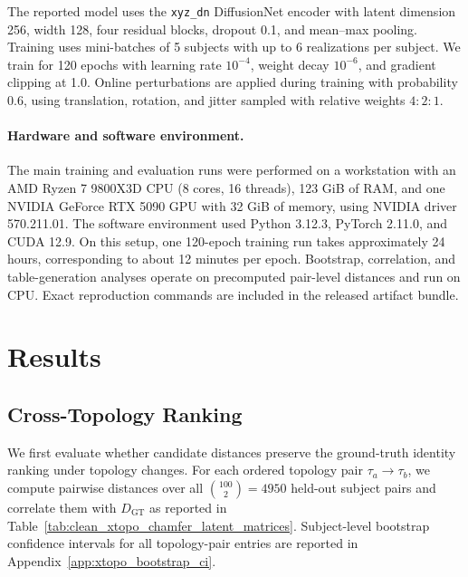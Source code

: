 \documentclass{article}
\begin{document}
The reported model uses the \texttt{xyz\_dn} DiffusionNet encoder with latent dimension 256, width 128, four residual blocks, dropout 0.1, and mean--max pooling. Training uses mini-batches of 5 subjects with up to 6 realizations per subject. We train for 120 epochs with learning rate $10^{-4}$, weight decay $10^{-6}$, and gradient clipping at 1.0. Online perturbations are applied during training with probability 0.6, using translation, rotation, and jitter sampled with relative weights $4{:}2{:}1$.

\paragraph{Hardware and software environment.}
The main training and evaluation runs were performed on a workstation with an AMD Ryzen 7 9800X3D CPU
(8 cores, 16 threads), 123 GiB of RAM, and one NVIDIA GeForce RTX 5090 GPU
with 32 GiB of memory, using NVIDIA driver 570.211.01. The software environment
used Python 3.12.3, PyTorch 2.11.0, and CUDA 12.9. On this setup, one 120-epoch
training run takes approximately 24 hours, corresponding to about 12 minutes per
epoch. Bootstrap, correlation, and table-generation analyses operate on
precomputed pair-level distances and run on CPU. Exact reproduction commands are
included in the released artifact bundle.

\section{Results}
\label{sec:results}

\subsection{Cross-Topology Ranking}
\label{sec:xtopo_results}
We first evaluate whether candidate distances preserve the ground-truth identity ranking under topology changes. For each ordered topology pair $\tau_a \rightarrow \tau_b$, we compute pairwise distances over all $\binom{100}{2}=4950$ held-out subject pairs and correlate them with $D_{\mathrm{GT}}$ as reported in Table~\ref{tab:clean_xtopo_chamfer_latent_matrices}. Subject-level bootstrap confidence intervals for all topology-pair entries are reported in Appendix~\ref{app:xtopo_bootstrap_ci}.
\end{document}
